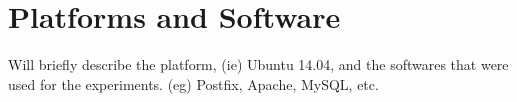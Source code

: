 \section[Platform]{Platforms and Software}

Will briefly describe the platform, (ie) Ubuntu 14.04, and the softwares that were used for the experiments. (eg) Postfix, Apache, MySQL, etc.